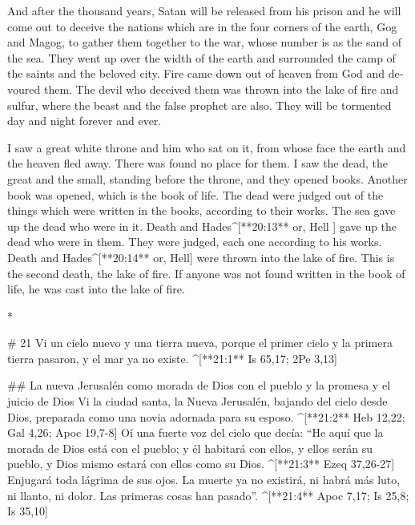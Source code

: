 \begin{paracols}{2}
\begin{english}
 And after the thousand years, Satan will be released from his prison  and he will come out to deceive the nations which are in the four corners of the earth, Gog and Magog, to gather them together to the war, whose number is as the sand of the sea.  They went up over the width of the earth and surrounded the camp of the saints and the beloved city. Fire came down out of heaven from God and devoured them.  The devil who deceived them was thrown into the lake of fire and sulfur, where the beast and the false prophet are also. They will be tormented day and night forever and ever. 

 I saw a great white throne and him who sat on it, from whose face the earth and the heaven fled away. There was found no place for them.  I saw the dead, the great and the small, standing before the throne, and they opened books. Another book was opened, which is the book of life. The dead were judged out of the things which were written in the books, according to their works.  The sea gave up the dead who were in it. Death and Hades^[**20:13** or, Hell ] gave up the dead who were in them. They were judged, each one according to his works.  Death and Hades^[**20:14** or, Hell] were thrown into the lake of fire. This is the second death, the lake of fire.  If anyone was not found written in the book of life, he was cast into the lake of fire.

\end{english}
\switchcolumn[0]*

# 21
 Vi un cielo nuevo y una tierra nueva, porque el primer cielo y la primera tierra pasaron, y el mar ya no existe. ^[**21:1** Is 65,17; 2Pe 3,13]

## La nueva Jerusalén como morada de Dios con el pueblo y la promesa y el juicio de Dios
 Vi la ciudad santa, la Nueva Jerusalén, bajando del cielo desde Dios, preparada como una novia adornada para su esposo. ^[**21:2** Heb 12,22; Gal 4,26; Apoc 19,7-8]  Oí una fuerte voz del cielo que decía: “He aquí que la morada de Dios está con el pueblo; y él habitará con ellos, y ellos serán su pueblo, y Dios mismo estará con ellos como su Dios. ^[**21:3** Ezeq 37,26-27]  Enjugará toda lágrima de sus ojos. La muerte ya no existirá, ni habrá más luto, ni llanto, ni dolor. Las primeras cosas han pasado”. ^[**21:4** Apoc 7,17; Is 25,8; Is 35,10]


\end{paracols}
